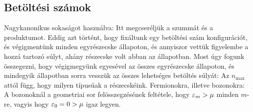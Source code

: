   \subsection{Betöltési számok}
  
   Nagykanonikus sokaságot használva:
   Itt megcseréljük a szummát és a produktumot. Eddig azt történt, hogy fixáltunk egy betöltési szám konfigurációt, és végigmentünk minden egyrészecske állapoton, és annyiszor vettük figyelembe a hozzá tartozó súlyt, ahány részecske volt abban az állapotban. Most úgy fogunk összegezni, hogy végigmegyünk egyesével az összes egyrészecske állapoton, és mindegyik állapotban sorra vesszük az összes lehetséges betöltés súlyát:
   Az $n_\text{max}$ attól függ, hogy milyen típusúak a részecskéink. Fermionokra, illetve bozonokra:
   A bozonoknál a geometriai sor felösszegzésének feltétele, hogy $\varepsilon_m>\mu$ minden $m$-re, vagyis hogy $\varepsilon_0=0>\mu$ igaz legyen.
   
